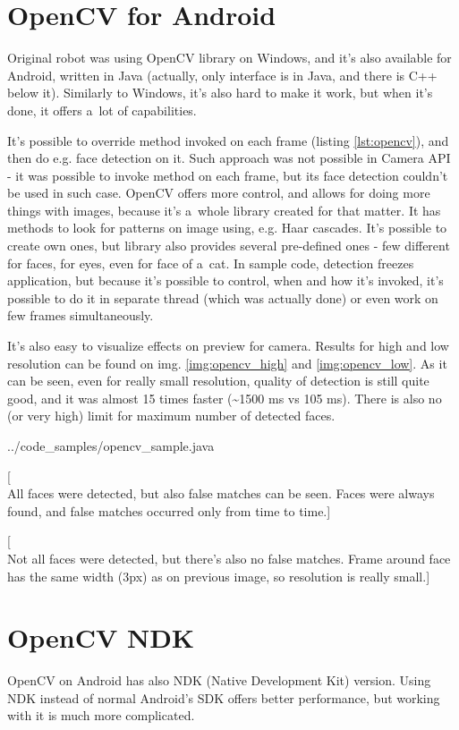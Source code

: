\section{OpenCV for Android}
Original robot was using OpenCV library on Windows, and it's also available for
Android, written in Java (actually, only interface is in Java, and there is
C++ below it).
Similarly to Windows, it's also hard to make it work, but when it's done, it offers a~lot of capabilities.

It's possible to override method invoked on each frame (listing
\ref{lst:opencv}), and then do e.g. face detection on it.
Such approach was not possible in Camera API - it was possible to invoke method
on each frame, but its face detection couldn't be used in such case.
OpenCV offers more control, and allows for doing more things with images,
because it's a~whole library created for that matter.
It has methods to look for patterns on image using, e.g. Haar cascades.
It's possible to create own ones, but library also provides several pre-defined
ones - few different for faces, for eyes, even for face of a~cat.
In sample code, detection freezes application, but because it's possible to
control, when and how it's invoked, it's possible to do it in separate thread
(which was actually done) or even work on few frames simultaneously.

It's also easy to visualize effects on preview for camera. Results for high and
low resolution can be found on img. \ref{img:opencv_high} and
\ref{img:opencv_low}.
As it can be seen, even for really small resolution, quality of detection is
still quite good, and it was almost 15 times faster (\textasciitilde1500 ms vs
105 ms).
There is also no (or very high) limit for maximum number of detected faces.


{../code_samples/opencv_sample.java}

[\\All faces were detected, but also false matches can be seen. Faces were
always found, and false matches occurred only from time to time.]

[\\Not all faces were detected, but there's also no false matches. Frame
around face has the same width (3px) as on previous image, so resolution is
really small.]

\section{OpenCV NDK}
OpenCV on Android has also NDK (Native Development Kit) version.
Using NDK instead of normal Android's SDK offers better performance, but working
with it is much more complicated.

